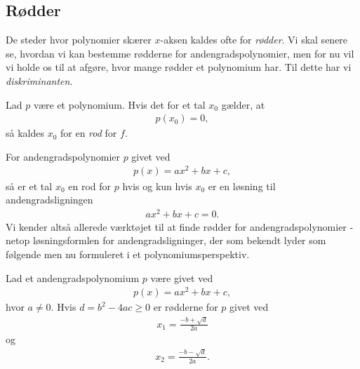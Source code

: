 \subsection*{Rødder}
De steder hvor polynomier skærer $x$-aksen kaldes ofte for \textit{rødder}. Vi skal senere se, hvordan vi kan bestemme rødderne for andengradspolynomier, men for nu vil vi holde os til at afgøre, hvor mange rødder et polynomium har. Til dette har vi \textit{diskriminanten}.

\begin{defn}[Rod]
	Lad $p$ være et polynomium. Hvis det for et tal $x_0$ gælder, at
	\begin{align*}
		p(x_0) = 0,
	\end{align*}
	så kaldes $x_0$ for en \textit{rod} for $f$. 
\end{defn}

For andengradspolynomier $p$ givet ved
\begin{align*}
	p(x) = ax^2 + bx + c,
\end{align*}
så er et tal $x_0$ en rod for $p$ hvis og kun hvis $x_0$ er en løsning til andengradsligningen
\begin{align*}
	ax^2 + bx + c = 0.
\end{align*}
Vi kender altså allerede værktøjet til at finde rødder for andengradspolynomier - netop løsningsformlen for andengradsligninger, der som bekendt lyder som følgende men nu formuleret i et polynomiumsperspektiv.
\begin{setn}[Diskriminantformlen]
	Lad et andengradspolynomium $p$ være givet ved
	\begin{align*}
		p(x) = ax^2 + bx + c,
	\end{align*}
	hvor $a \neq 0$. Hvis $d = b^2- 4ac \geq 0$ er rødderne for $p$ givet ved
	\begin{align*}
		x_1 = \frac{-b + \sqrt{d}}{2a}
	\end{align*}
	og
	\begin{align*}
		x_2 = \frac{-b - \sqrt{d}}{2a}.
	\end{align*}
\end{setn}

